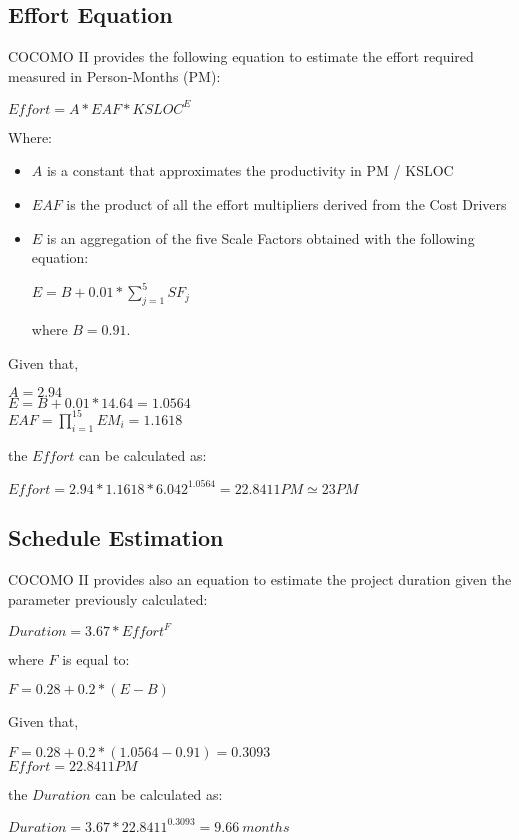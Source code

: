 \subsection{Effort Equation}
COCOMO II provides the following equation to estimate the effort required measured in Person-Months (PM):
\begin{center}
$Effort = A * EAF * KSLOC^E$
\end{center}
Where:
\begin{itemize}
	\item $A$ is a constant that approximates the productivity in PM / KSLOC
	\item $EAF$ is the product of all the effort multipliers derived from the Cost Drivers
	\item $E$ is an aggregation of the five Scale Factors obtained with the following equation:
	\begin{center}
		$E = B + 0.01 * \sum\limits_{j=1}^5 SF_j$
	\end{center}
	where $B = 0.91$.
\end{itemize}
Given that,
\begin{center}
$A = 2.94$ \\[10pt]
$E = B + 0.01 * 14.64 = 1.0564$ \\[10pt]
$EAF = \prod\limits_{i=1}^{15} EM_i = 1.1618$
\end{center}
the $Effort$ can be calculated as:
\begin{center}
$Effort = 2.94 * 1.1618 * 6.042^{1.0564} = 22.8411 PM \simeq 23 PM$
\end{center}

\subsection{Schedule Estimation}
COCOMO II provides also an equation to estimate the project duration given the parameter previously calculated:
\begin{center}
	$Duration = 3.67 * Effort^F$
\end{center}
where $F$ is equal to:
\begin{center}
	$F = 0.28 + 0.2 * (E - B)$
\end{center}
Given that,
\begin{center}
	$F = 0.28 + 0.2 * (1.0564 - 0.91) = 0.3093$ \\[10pt]
	$Effort = 22.8411 PM$
\end{center}
the $Duration$ can be calculated as:
\begin{center}
	$Duration = 3.67 * 22.8411^{0.3093} = 9.66 \ months$
\end{center}

